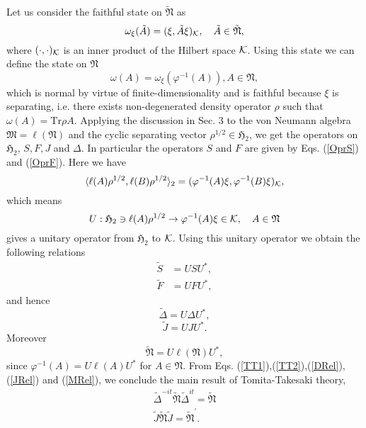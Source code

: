 Let us consider the faithful state on $\tilde{\mathfrak{N}}$ as
$$
\omega_\xi(\tilde{A})=(\xi,\tilde{A}\xi)_{\cal K},\quad \tilde{A}\in \tilde{\mathfrak{N}},
$$
where $(\cdot,\cdot)_{\cal K}$ is an inner product of the Hilbert space ${\cal K}$.
Using this state we can define the state on $\mathfrak{N}$
$$
\omega(A)=\omega_\xi(\varphi^{-1}(A)),A\in \mathfrak{N},
$$
which is normal by virtue of finite-dimensionality and is faithful because $\xi$ is separating, i.e. there exists non-degenerated density operator $\rho$ such that $\omega(A)=\mbox{Tr}\rho A$.
Applying the discussion in Sec. 3 to the von Neumann algebra $\mathfrak{M}=\ell(\mathfrak{N})$ and 
the cyclic separating vector $\rho^{1/2}\in \mathfrak{H}_2$, we get
the operators on $\mathfrak{H}_2$, $S, F, J$ and $\Delta$.
In particular the operators $S$ and $F$ are given by Eqs. (\ref{OprS}) and (\ref{OprF}).
Here we have
$$
\langle \ell(A)\rho^{1/2},\ell( B)\rho^{1/2}\rangle_2=(\varphi^{-1}(A)\xi,\varphi^{-1}(B)\xi)_{\cal K},
$$
which means
$$
U:\mathfrak{H}_2\ni\ell(A)\rho^{1/2}\to \varphi^{-1}(A)\xi\in {\cal K}, \quad A\in \mathfrak{N}
$$
gives a unitary operator from $\mathfrak{H}_2$ to ${\cal K}$.
Using this unitary operator we obtain the following relations
\begin{equation}
\begin{split}
\tilde{S}&=US U^{\ast},\\
\tilde{F}&=UFU^\ast ,
\end{split}
\end{equation}
and hence 
\begin{equation}\label{DRel}
\tilde{\Delta}=U\Delta U^\ast,
\end{equation}
\begin{equation}\label{JRel}
\tilde{J}=UJU^\ast.
\end{equation}
Moreover  
\begin{equation}\label{MRel}
\tilde{\mathfrak{N}}=U\ell(\mathfrak{N})U^\ast,
\end{equation}
since $\varphi^{-1}(A)=U\ell (A) U^\ast$ for $A\in \mathfrak{N}$.
From Eqs. (\ref{TT1}),(\ref{TT2}),(\ref{DRel}),(\ref{JRel}) and (\ref{MRel}), we conclude the main result of Tomita-Takesaki theory,
\begin{equation}
\begin{split}
\tilde{\Delta}^{-it}\tilde{\mathfrak{N}}\tilde{\Delta}^{it}=\tilde{\mathfrak{N}}\\
\tilde{J}\tilde{\mathfrak{N}}\tilde{J}=\tilde{\mathfrak{N}}^\prime.
\end{split}
\end{equation}



